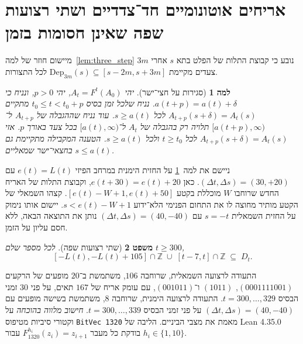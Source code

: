 \documentclass[11pt,a4paper]{article}
\DeclareRobustCommand{\textenglish}[1]{\foreignlanguage{english}{#1}}
\newtheorem{theorem}{משפט}[section]
\newtheorem{lemma}[theorem]{למה}
\begin{document}
\section{אריחים אוטונומיים חד־צדדיים ושתי רצועות שפה שאינן חסומות בזמן}

מיישום חוזר של למה~\ref{lem:three_step} נובע כי קבוצת התלות של הפלט בתא $s$ אחרי $3m$ צעדים מקיימת $\mathrm{Dep}_{3m}(s) \subseteq [s - 2m, s + 3m]$ לכל התצורות.

\begin{lemma}[סגירות על חצי־ישר]\label{lem:one_sided}
יהי $A_t = F^t(A_0)$, יהי $p > 0$, ונניח כי $a(t + p) = a(t) + \delta$. נניח שלכל זמן בסיס $t_0 \le t < t_0 + p$ מתקיים $A_{t+p}(s + \delta) = A_t(s)$ לכל $s \ge a(t)$. עוד נניח שההגבלה של $A_{t+p}$ ל־$[a(t+p), \infty)$ תלויה רק בהגבלה של $A_t$ ל־$[a(t), \infty)$ בכל צעד באורך $p$. אזי $A_{t+p}(s + \delta) = A_t(s)$ לכל $t \ge t_0$ ולכל $s \ge a(t)$. הטענה המקבילה מתקיימת גם בחצאי־ישר שמאליים $s \le a(t)$.
\end{lemma}

ניישם את למה~\ref{lem:one_sided} על החזית הימנית במרחב הפיזי $e(t) = L(t)$ עם $(\Delta t, \Delta s) = (30, +20)$. כאן $e(t+30) = e(t) + 20$, וקבוצת התלות של האריח החדש שרוחבו $W$ מוכללת בקטע $[e(t) - W + 1, e(t) + 50]$. קצהו השמאלי של הקטע מותיר מחוצה לו את התחום הפנימי הלא־ידוע $s < e(t) - W + 1$. יישום אותו נימוק על החזית השמאלית $s = -t$ עם $(\Delta t, \Delta s) = (40,-40)$ נותן את התוצאה הבאה, ללא חסם עליון על הזמן.

\begin{theorem}[שתי רצועות שפה]\label{thm:dual_strips}
לכל מספר שלם $t \ge 300$,
\begin{equation}\label{eq:dual_strips}
[-L(t), -L(t) + 105] \cap \mathbb{Z} \;\cup\; [t - 7, t] \cap \mathbb{Z} \;\subseteq\; D_t.
\end{equation}
\end{theorem}

התעודה לרצועה השמאלית, שרוחבה $106$, משתמשת ב־$20$ מופעים של הרקעים $(0001111001)$, $(1011)$ ו־$(001011)$, עם עומק אריח של $167$ תאים, על פני $30$ זמני הבסיס $t = 300, \dots, 329$. התעודה לרצועה הימנית, שרוחבה $8$, משתמשת בשישה מופעים עם $(\Delta t, \Delta s) = (40,-40)$ על פני זמני הבסיס $t = 300, \dots, 339$. \emph{חישוב מלווה בהוכחה} על וקטורי סיביות מטיפוס \textenglish{\texttt{BitVec 1320}} מאמת את מצבי הביניים. הליבה של \textenglish{Lean 4.35.0} בודקת כל מעבר $F_{1320}^{h_i}(z_i) = z_{i+1}$ עבור $h_i \in \{1, 10\}$.
\end{document}
